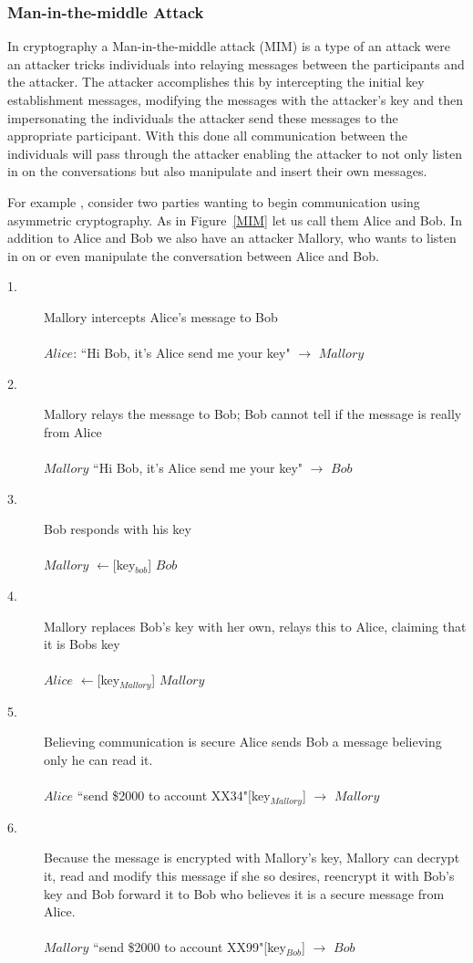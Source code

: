 \documentclass{sig-alternate}
\begin{document}
\subsubsection{Man-in-the-middle Attack}	
In cryptography a Man-in-the-middle attack (MIM) is a type of an attack were an attacker tricks individuals into relaying messages between the participants and the attacker. The attacker accomplishes this by intercepting the initial key establishment messages, modifying the messages with the attacker's key  and then impersonating the individuals the attacker send these messages to the appropriate participant. With this done all communication between the individuals will pass through the attacker enabling the attacker to not only listen in on the conversations but also manipulate and insert their own messages.

For example , consider two parties wanting to begin communication using  asymmetric cryptography. As in Figure~\ref{MIM} let us call them Alice and Bob. In addition to Alice and Bob we also have an attacker Mallory, who wants to listen in on or even manipulate the conversation between Alice and Bob.
	\begin{description}
	\item[1.] Mallory intercepts Alice's message to Bob\hfill\\\\
	$Alice$: ``Hi Bob, it's Alice send me your key" $\rightarrow$ $Mallory$
	\item[2.] Mallory relays the message to Bob; Bob cannot tell if the message is really from Alice \hfill\\\\
	 $Mallory$ ``Hi Bob, it's Alice send me your key" $\rightarrow$ $Bob$ 	
	\item[3.]Bob responds with his key \hfill\\\\
	$Mallory$ $\leftarrow$[key$_{bob}$]  $Bob$
	\item[4.] Mallory replaces Bob's key with her own, relays this to  Alice, claiming that it is Bobs key\hfill\\\\
	$Alice$ $\leftarrow$[key$_{Mallory}$] $Mallory$
	\item[5.]
	Believing communication is secure Alice sends Bob a message believing only he can read it. \hfill\\\\
	$Alice$ ``send \$2000 to account XX34"[key$_{Mallory}$] $\rightarrow$ $Mallory$
	\item[6.] Because the message is encrypted with Mallory's key, Mallory can decrypt it, read and modify this message if she so desires, reencrypt it with Bob's key and Bob forward it to Bob who believes it is a secure message from Alice. \hfill\\\\
	$Mallory$ ``send \$2000 to account XX99"[key$_{Bob}$] $\rightarrow$ $Bob$
	\end{description}	
\end{document}
